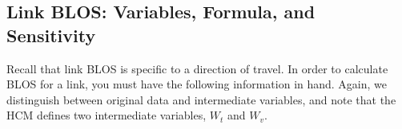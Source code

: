 \documentclass[11pt]{article} %
\begin{document}
\subsection{Link BLOS: Variables, Formula, and Sensitivity}
Recall that link BLOS is specific to a direction of travel. In order to calculate BLOS for a link, you must have the following information in hand. Again, we distinguish between original data and intermediate variables, and note that the HCM defines two intermediate variables, $W_t$ and $W_v$.

\end{document}
